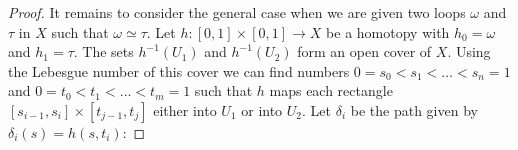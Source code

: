 \documentclass[11pt, letterpaper, oneside]{report}
\theoremstyle{pplain}
\theoremstyle{ddefinition}
\theoremstyle{nnn}
\theoremstyle{eexercise}
\begin{document}
\begin{proof}
It remains to consider the general case when we are given two  loops $\omega$ and $\tau$ in $X$
such that $\omega\simeq \tau$. Let $h\colon [0, 1]\times [0, 1]\to X$ be a homotopy with 
$h_{0} = \omega$  and $h_{1} = \tau$. The sets $h^{-1}(U_{1})$ and $h^{-1}(U_{2})$ form an 
open cover of $X$. Using the Lebesgue number of this  cover we can find numbers
$0=s_{0} < s_{1} < {\dots} < s_{n} = 1$ and $0=t_{0} < t_{1} < {\dots} < t_{m} = 1$
such that $h$ maps each rectangle $[s_{i-1}, s_{i}]\times [t_{j-1},  t_{j}]$ either into 
$U_{1}$ or into $U_{2}$. Let $\delta_{i}$ be the path given  by $\delta_{i}(s) = h(s, t_{i})$:

\end{proof}
\end{document}
